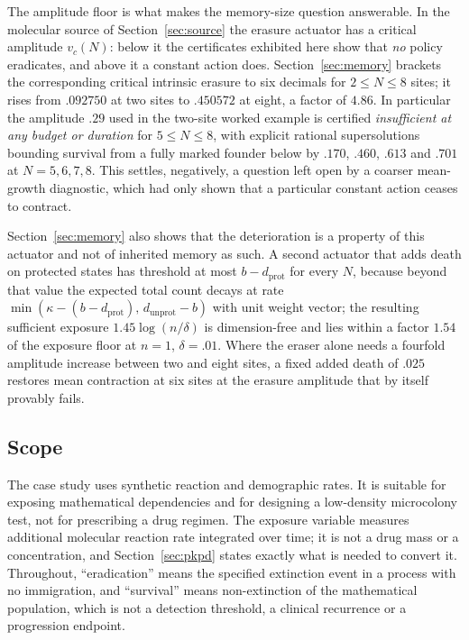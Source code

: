 The amplitude floor is what makes the memory-size question answerable. In the
molecular source of Section~\ref{sec:source} the erasure actuator has a
critical amplitude $v_c(N)$: below it the certificates exhibited here show that
\emph{no} policy eradicates, and above it a constant action does.
Section~\ref{sec:memory} brackets the corresponding
critical intrinsic erasure to six decimals for $2\le N\le8$ sites; it rises from
$.092750$ at two sites to $.450572$ at eight, a factor of $4.86$. In particular
the amplitude $.29$ used in the two-site worked example is certified
\emph{insufficient at any budget or duration} for $5\le N\le8$, with explicit
rational supersolutions bounding survival from a fully marked founder below by
$.170$, $.460$, $.613$ and $.701$ at $N=5,6,7,8$. This settles, negatively, a
question left open by a coarser mean-growth diagnostic, which had only shown
that a particular constant action ceases to contract.

Section~\ref{sec:memory} also shows that the deterioration is a property of this
actuator and not of inherited memory as such. A second actuator that adds death
on protected states has threshold at most $b-d_{\mathrm{prot}}$ for every $N$,
because beyond that value the expected total count decays at rate
$\min(\kappa-(b-d_{\mathrm{prot}}),\,d_{\mathrm{unprot}}-b)$ with unit weight
vector; the resulting sufficient exposure $1.45\log(n/\delta)$ is dimension-free
and lies within a factor $1.54$ of the exposure floor at $n=1$, $\delta=.01$.
Where the eraser alone needs a fourfold amplitude increase between two and eight
sites, a fixed added death of $.025$ restores mean contraction at six sites at
the erasure amplitude that by itself provably fails.

\subsection*{Scope}

The case study uses synthetic reaction and demographic rates. It is suitable for
exposing mathematical dependencies and for designing a low-density microcolony
test, not for prescribing a drug regimen. The exposure variable measures
additional molecular reaction rate integrated over time; it is not a drug mass
or a concentration, and Section~\ref{sec:pkpd} states exactly what is needed to
convert it. Throughout, ``eradication'' means the specified extinction event in
a process with no immigration, and ``survival'' means non-extinction of the
mathematical population, which is not a detection threshold, a clinical
recurrence or a progression endpoint.
